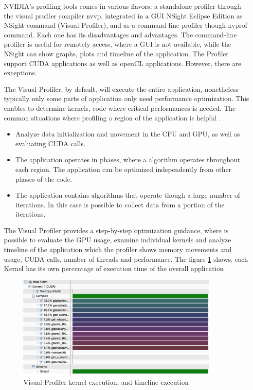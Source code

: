 NVIDIA's profiling tools comes in various flavors; a standalone profiler through the visual profiler compiler nvvp, integrated in a GUI NSight Eclipse Edition as NSight command (Visual Profiler), and as a command-line profiler though nvprof command. Each one has its disadvantages and advantages. The command-line profiler is useful for remotely access, where a GUI is not available, while the NSight can show graphs, plots and timeline of the application. The Profiler support CUDA applications as well as openCL applications. However, there are exceptions. 

The Visual Profiler, by default, will execute the entire application, nonetheless typically only some parts of application only need performance optimization. This enables to determine kernels, code where critical performances is needed. The common situations where profiling a region of the application is helpful \cite{tool}.

\begin{itemize}
  \item Analyze data initialization and movement in the CPU and GPU, as well as evaluating CUDA calls.
  \item The application operates in phases, where a algorithm operates throughout each region. The application can be optimized independently from other phases of the code.
  \item The application contains algorithms that operate though a large number of iterations. In this case is possible to collect data from a portion of the iterations.
\end{itemize}

The Visual Profiler provides a step-by-step optimization guidance, where is possible to evaluate the GPU usage, examine individual kernels and analyze timeline of the application which the profiler shows memory movements and usage, CUDA calls, number of threads and performance. The figure \ref{fig:visual01} shows, each Kernel has its own percentage of execution time of the overall application \cite{practices}.

\begin{figure}[htbp]
	\centering
		\includegraphics[width=0.9\textwidth]{Figures/pofiler.png}
		\smallskip
	\caption[Visual Profiler timeline and stream process]{Visual Profiler kernel execution, and timeline execution}
	\label{fig:visual01}
\end{figure}

